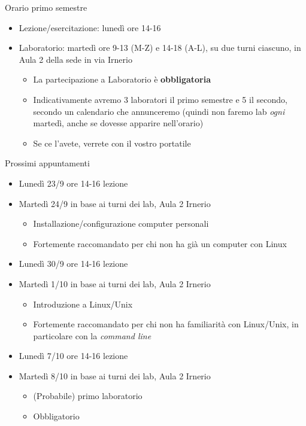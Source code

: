 \begin{frame}{Orario primo semestre}
  \begin{itemize}
  \item Lezione/esercitazione: lunedì ore 14-16
  \item Laboratorio: martedì ore 9-13 (M-Z) e 14-18 (A-L), su due
    turni ciascuno, in Aula 2 della sede in via Irnerio
    \begin{itemize}
    \item La partecipazione a Laboratorio è \textbf{obbligatoria}
    \item Indicativamente avremo 3 laboratori il primo semestre e 5 il secondo,
      secondo un calendario che annunceremo (quindi non faremo lab \textit{ogni}
      martedì, anche se dovesse apparire nell'orario)
    \item Se ce l'avete, verrete con il vostro portatile
    \end{itemize}
  \end{itemize}
\end{frame}

\begin{frame}{Prossimi appuntamenti}
  \begin{itemize}

  \item Lunedì 23/9 ore 14-16 lezione

  \item Martedì 24/9 in base ai turni dei lab, Aula 2 Irnerio
    \begin{itemize}
    \item Installazione/configurazione computer personali
    \item Fortemente raccomandato per chi non ha già un computer con Linux
    \end{itemize}

  \item Lunedì 30/9 ore 14-16 lezione

  \item Martedì 1/10 in base ai turni dei lab, Aula 2 Irnerio
    \begin{itemize}
    \item Introduzione a Linux/Unix
    \item Fortemente raccomandato per chi non ha familiarità con Linux/Unix, in
      particolare con la \textit{command line}
    \end{itemize}

  \item Lunedì 7/10 ore 14-16 lezione

  \item Martedì 8/10 in base ai turni dei lab, Aula 2 Irnerio
    \begin{itemize}
    \item (Probabile) primo laboratorio
    \item Obbligatorio
    \end{itemize}

  \end{itemize}
\end{frame}

